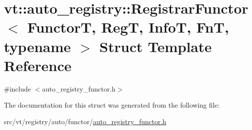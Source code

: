 \hypertarget{structvt_1_1auto__registry_1_1_registrar_functor}{}\section{vt\+:\+:auto\+\_\+registry\+:\+:Registrar\+Functor$<$ FunctorT, RegT, InfoT, FnT, typename $>$ Struct Template Reference}
\label{structvt_1_1auto__registry_1_1_registrar_functor}


{\ttfamily \#include $<$auto\+\_\+registry\+\_\+functor.\+h$>$}



The documentation for this struct was generated from the following file\+:\begin{DoxyCompactItemize}
\item 
src/vt/registry/auto/functor/\hyperlink{auto__registry__functor_8h}{auto\+\_\+registry\+\_\+functor.\+h}\end{DoxyCompactItemize}
